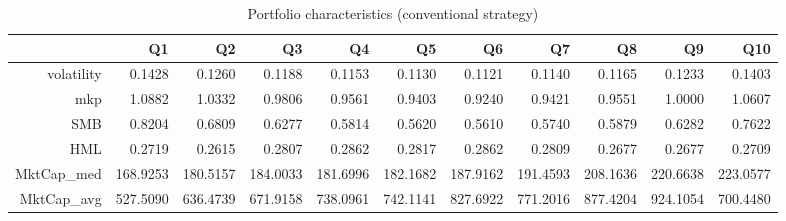 \begin{table}[ht]
\centering
\begin{tabular}{rrrrrrrrrrr}
  \hline
 & Q1 & Q2 & Q3 & Q4 & Q5 & Q6 & Q7 & Q8 & Q9 & Q10 \\ 
  \hline
volatility & 0.1428 & 0.1260 & 0.1188 & 0.1153 & 0.1130 & 0.1121 & 0.1140 & 0.1165 & 0.1233 & 0.1403 \\ 
  mkp & 1.0882 & 1.0332 & 0.9806 & 0.9561 & 0.9403 & 0.9240 & 0.9421 & 0.9551 & 1.0000 & 1.0607 \\ 
  SMB & 0.8204 & 0.6809 & 0.6277 & 0.5814 & 0.5620 & 0.5610 & 0.5740 & 0.5879 & 0.6282 & 0.7622 \\ 
  HML & 0.2719 & 0.2615 & 0.2807 & 0.2862 & 0.2817 & 0.2862 & 0.2809 & 0.2677 & 0.2677 & 0.2709 \\ 
  MktCap\_med & 168.9253 & 180.5157 & 184.0033 & 181.6996 & 182.1682 & 187.9162 & 191.4593 & 208.1636 & 220.6638 & 223.0577 \\ 
  MktCap\_avg & 527.5090 & 636.4739 & 671.9158 & 738.0961 & 742.1141 & 827.6922 & 771.2016 & 877.4204 & 924.1054 & 700.4480 \\ 
   \hline
\end{tabular}
\caption{Portfolio characteristics (conventional strategy)} 
\label{tab:PortChar}
\end{table}
